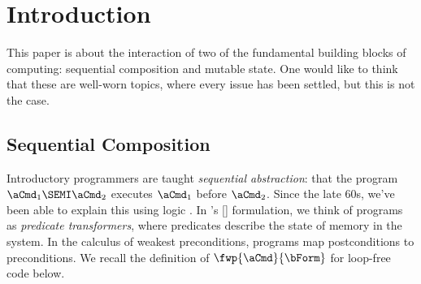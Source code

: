 \section{Introduction}
\label{sec:intro}

This paper is about the interaction of two of the fundamental building blocks
of computing: sequential composition and mutable state. One would like to
think that these are well-worn topics, where every issue has been settled,
but this is not the case.

\subsection{Sequential Composition} %

Introductory programmers are taught \emph{sequential abstraction}: that the
program $\aCmd_1\SEMI \aCmd_2$ executes $\aCmd_1$ before $\aCmd_2$.  Since
the late 60s, we've been able to explain this using logic
\citep{Hoare:1969:ABC:363235.363259}.  In
\citeauthor{DBLP:journals/cacm/Dijkstra75}'s
[\citeyear{DBLP:journals/cacm/Dijkstra75}] formulation, we think of programs
as \emph{predicate transformers}, where predicates describe the state of
memory in the system.  In the calculus of weakest preconditions, programs map
postconditions to preconditions.  We recall the definition of
$\fwp{\aCmd}{\bForm}$ for loop-free code below. 

